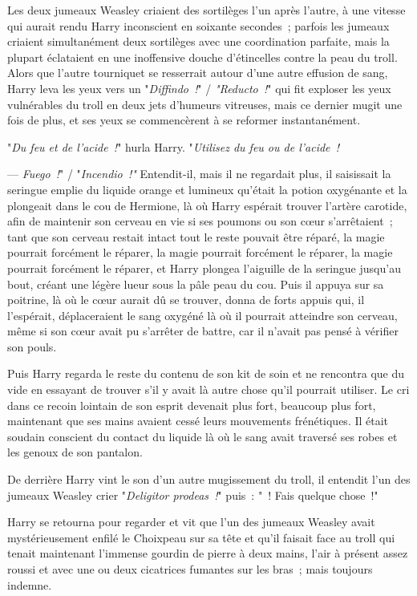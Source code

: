 Les deux jumeaux Weasley criaient des sortilèges l'un après l'autre, à une vitesse qui aurait rendu Harry inconscient en soixante secondes~; parfois les jumeaux criaient simultanément deux sortilèges avec une coordination parfaite, mais la plupart éclataient en une inoffensive douche d'étincelles contre la peau du troll. Alors que l'autre tourniquet se resserrait autour d'une autre effusion de sang, Harry leva les yeux vers un "\emph{Diffindo~!}" / \emph{"Reducto~!}" qui fit exploser les yeux vulnérables du troll en deux jets d'humeurs vitreuses, mais ce dernier mugit une fois de plus, et ses yeux se commencèrent à se reformer instantanément.

"\emph{Du feu et de l'acide~!}" hurla Harry. "\emph{Utilisez du feu ou de l'acide~!}

--- \emph{Fuego~!}" / "\emph{Incendio~!"} Entendit-il, mais il ne regardait plus, il saisissait la seringue emplie du liquide orange et lumineux qu'était la potion oxygénante et la plongeait dans le cou de Hermione, là où Harry espérait trouver l'artère carotide, afin de maintenir son cerveau en vie si ses poumons ou son cœur s'arrêtaient~; tant que son cerveau restait intact tout le reste pouvait être réparé, la magie pourrait forcément le réparer, la magie pourrait forcément le réparer, la magie pourrait forcément le réparer, et Harry plongea l'aiguille de la seringue jusqu'au bout, créant une légère lueur sous la pâle peau du cou. Puis il appuya sur sa poitrine, là où le cœur aurait dû se trouver, donna de forts appuis qui, il l'espérait, déplaceraient le sang oxygéné là où il pourrait atteindre son cerveau, même si son cœur avait pu s'arrêter de battre, car il n'avait pas pensé à vérifier son pouls.

Puis Harry regarda le reste du contenu de son kit de soin et ne rencontra que du vide en essayant de trouver s'il y avait là autre chose qu'il pourrait utiliser. Le cri dans ce recoin lointain de son esprit devenait plus fort, beaucoup plus fort, maintenant que ses mains avaient cessé leurs mouvements frénétiques. Il était soudain conscient du contact du liquide là où le sang avait traversé ses robes et les genoux de son pantalon.

De derrière Harry vint le son d'un autre mugissement du troll, il entendit l'un des jumeaux Weasley crier "\emph{Deligitor prodeas~!}" puis~: "~! Fais quelque chose~!"

Harry se retourna pour regarder et vit que l'un des jumeaux Weasley avait mystérieusement enfilé le Choixpeau sur sa tête et qu'il faisait face au troll qui tenait maintenant l'immense gourdin de pierre à deux mains, l'air à présent assez roussi et avec une ou deux cicatrices fumantes sur les bras~; mais toujours indemne.

